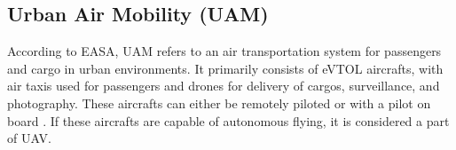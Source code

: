 \subsection{Urban Air Mobility (UAM)}

According to \gls{EASA}, \gls{UAM} refers to an air transportation system for passengers and cargo in urban environments.%
It primarily consists of \gls{eVTOL} aircrafts, with air taxis used for passengers and drones for delivery of cargos, surveillance, and photography. 
These aircrafts can either be remotely piloted or with a pilot on board \cite{easa_uam}. 
If these aircrafts are capable of autonomous flying, it is considered a part of \gls{UAV}.
